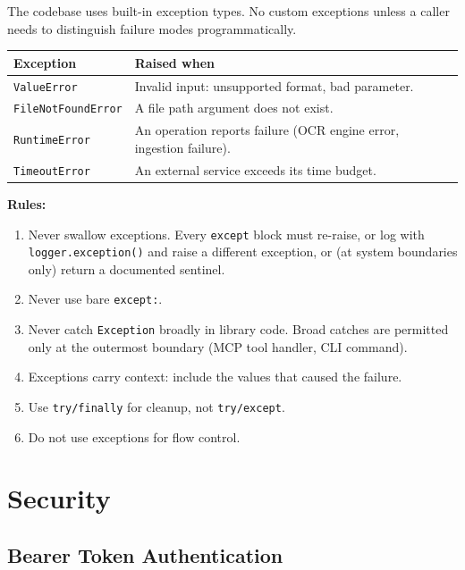 \documentclass[a4paper,10pt]{article}
\begin{document}
The codebase uses built-in exception types.  No custom exceptions
unless a caller needs to distinguish failure modes programmatically.

\begin{center}
\begin{tabular}{lp{8cm}}
\toprule
\textbf{Exception} & \textbf{Raised when} \\
\midrule
\texttt{ValueError}       & Invalid input: unsupported format, bad
                            parameter. \\
\texttt{FileNotFoundError} & A file path argument does not exist. \\
\texttt{RuntimeError}      & An operation reports failure (OCR engine
                            error, ingestion failure). \\
\texttt{TimeoutError}      & An external service exceeds its time
                            budget. \\
\bottomrule
\end{tabular}
\end{center}

\textbf{Rules:}

\begin{enumerate}
  \item Never swallow exceptions.  Every \texttt{except} block must
    re-raise, or log with \texttt{logger.exception()} and raise a
    different exception, or (at system boundaries only) return a
    documented sentinel.
  \item Never use bare \texttt{except:}.
  \item Never catch \texttt{Exception} broadly in library code.  Broad
    catches are permitted only at the outermost boundary (MCP tool
    handler, CLI command).
  \item Exceptions carry context: include the values that caused the
    failure.
  \item Use \texttt{try/finally} for cleanup, not
    \texttt{try/except}.
  \item Do not use exceptions for flow control.
\end{enumerate}

\section{Security}

\subsection{Bearer Token Authentication}
\end{document}
